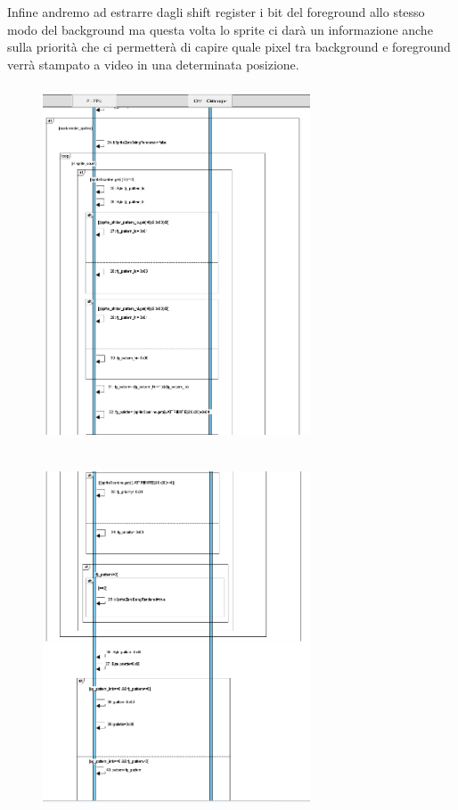 \documentclass[11pt]{article}
\begin{document}
Infine andremo ad estrarre dagli shift register i bit del foreground allo stesso modo del background ma questa volta lo sprite ci darà un informazione anche sulla priorità che ci permetterà di capire quale pixel tra background e foreground verrà stampato a video in una determinata posizione. \\
\begin{figure}[h]
\hspace*{-4.2cm}
\centering
\includegraphics[width=300px, height=400px]{Foreground1.png}\\
\end{figure}
\begin{figure}[h]
\hspace*{-4.2cm}
\centering
\includegraphics[width=300px, height=400px]{Foreground2.png}\\
\end{figure}
\end{document}

